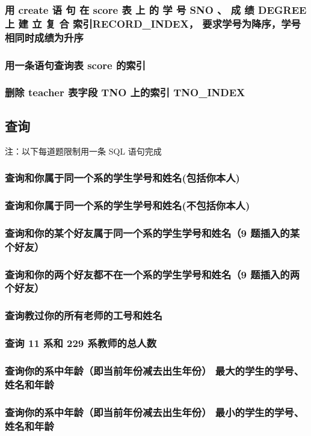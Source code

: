 \documentclass{ctexart}
\begin{document}
\subsubsection{用 create 语 句 在 score 表 上 的 学 号 SNO 、 成 绩 DEGREE 上 建 立 复 合 索引RECORD\_INDEX， 要求学号为降序，学号相同时成绩为升序}
\subsubsection{用一条语句查询表 score 的索引}
\subsubsection{删除 teacher 表字段 TNO 上的索引 TNO\_INDEX}
\subsection{查询}
注：以下每道题限制用一条 SQL 语句完成
\subsubsection{查询和你属于同一个系的学生学号和姓名(包括你本人)}
\subsubsection{查询和你属于同一个系的学生学号和姓名(不包括你本人)}
\subsubsection{查询和你的某个好友属于同一个系的学生学号和姓名（9 题插入的某个好友）}
\subsubsection{查询和你的两个好友都不在一个系的学生学号和姓名（9 题插入的两个好友）}
\subsubsection{查询教过你的所有老师的工号和姓名}
\subsubsection{查询 11 系和 229 系教师的总人数}
\subsubsection{查询你的系中年龄（即当前年份减去出生年份） 最大的学生的学号、姓名和年龄}
\subsubsection{查询你的系中年龄（即当前年份减去出生年份） 最小的学生的学号、姓名和年龄}
\end{document}
